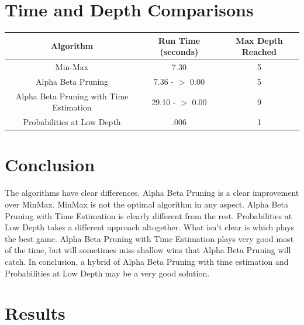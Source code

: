 \documentclass[12pt]{article}
\begin{document}
\pagebreak

\section{Time and Depth Comparisons}
\small
\begin{tabular}{| c | c | c |}
	\hline
	\textbf{Algorithm}	&	\textbf{Run Time} (seconds)	&	\textbf{Max Depth Reached} \\
	\hline
	Min-Max			&	7.30					&	5					\\
	\hline
	Alpha Beta Pruning	&	7.36 - $>$ 0.00			&	5					\\
	\hline
	Alpha Beta Pruning with Time Estimation	&	29.10 - $>$ 0.00	&	9		\\
	\hline
	Probabilities at Low Depth	&	.006		&	1							\\
	\hline
\end{tabular}
\normalsize


\section{Conclusion}
The algorithms have clear differences. Alpha Beta Pruning is a clear improvement over MinMax. MinMax is not
the optimal algorithm in any aspect. Alpha Beta Pruning with Time Estimation is clearly different from the rest.
Probabilities at Low Depth takes a different approach altogether. What isn't clear is which plays the best game.
Alpha Beta Pruning with Time Estimation plays very good most of the time, but will sometimes miss shallow
wins that Alpha Beta Pruning will catch. In conclusion, a hybrid of Alpha Beta Pruning with time estimation and
Probabilities at Low Depth may be a very good solution.

\section{Results}

\pagebreak

\end{document}
